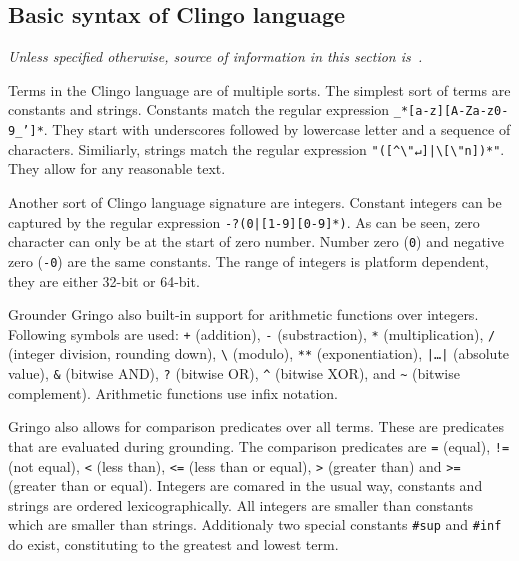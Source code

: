 \subsection{Basic syntax of Clingo language}

\vspace{-0.5em}
\textit{%
    Unless specified otherwise,
    source of information in this section is~\cite{gebser2019potassco}.}
    \vspace{1em}

Terms in the Clingo language are of multiple sorts.
The simplest sort of terms are constants and strings.
Constants match the regular expression \texttt{\_*[a-z][A-Za-z0-9\_']*}.  %
They start with underscores followed by lowercase letter and a sequence of characters.
Similiarly, strings match the regular expression
\texttt{"([\^{}\textbackslash"↵]|\textbackslash[\textbackslash"n])*"}.  %
They allow for any reasonable text.

Another sort of Clingo language signature are integers.
Constant integers can be captured by the regular expression
\texttt{-?(0|[1-9][0-9]*)}.  %
As can be seen, zero character can only be at the start of zero number.
Number zero (\texttt{0}) and negative zero (\texttt{-0}) are the same constants.
The range of integers is platform dependent, they are either 32-bit or 64-bit.

Grounder Gringo also built-in support for arithmetic functions over integers.
Following symbols are used: \texttt{+} (addition), \texttt{-} (substraction), \texttt{*}
(multiplication), \texttt{/} (integer division, rounding down), \texttt{\textbackslash}
(modulo), \texttt{**} (exponentiation), \texttt{|\ldots|} (absolute value),
\texttt{\&} (bitwise AND), \texttt{?} (bitwise OR), \texttt{\^{}} (bitwise XOR),
and \texttt{\~} (bitwise complement).  %
Arithmetic functions use infix notation.

Gringo also allows for comparison predicates over all terms.
These are predicates that are evaluated during grounding.
The comparison predicates are \texttt{=} (equal), \texttt{!=} (not equal),
\texttt{<} (less than), \texttt{<=} (less than or equal),
\texttt{>} (greater than) and \texttt{>=} (greater than or equal).
Integers are comared in the usual way, constants and strings are ordered lexicographically.
All integers are smaller than constants which are smaller than strings.
Additionaly two special constants \texttt{\#sup} and \texttt{\#inf} do exist,
constituting to the greatest and lowest term.

